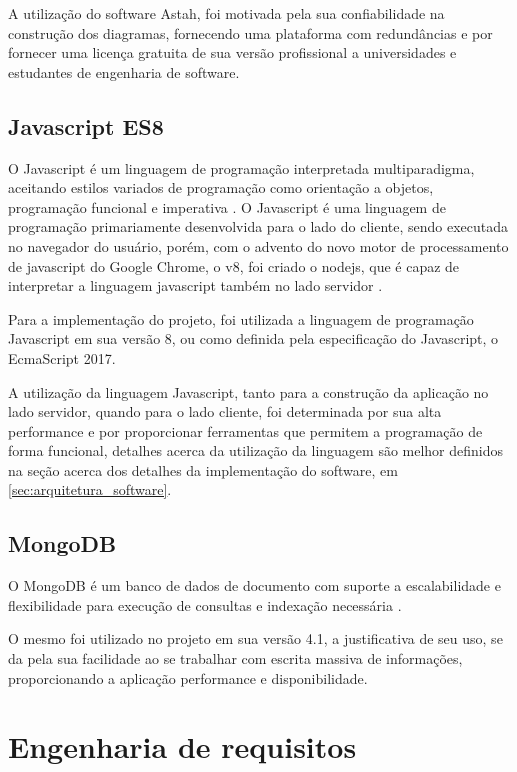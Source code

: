 A utilização do software Astah, foi motivada pela sua confiabilidade na construção dos diagramas, fornecendo uma plataforma com redundâncias e por fornecer uma licença gratuita de sua versão profissional a universidades e estudantes de engenharia de software.

\section{Javascript ES8}

O Javascript é um linguagem de programação interpretada multiparadigma, aceitando estilos variados de programação como orientação a objetos, programação funcional e imperativa \cite{mozilla_javascript}. O Javascript é uma linguagem de programação primariamente desenvolvida para o lado do cliente, sendo executada no navegador do usuário, porém, com o advento do novo motor de processamento de javascript do Google Chrome, o v8, foi criado o nodejs, que é capaz de interpretar a linguagem javascript também no lado servidor \cite{nodejs_about}.

Para a implementação do projeto, foi utilizada a linguagem de programação Javascript em sua versão 8, ou como definida pela especificação do Javascript, o EcmaScript 2017.

A utilização da linguagem Javascript, tanto para a construção da aplicação no lado servidor, quando para o lado cliente, foi determinada por sua alta performance e por proporcionar ferramentas que permitem a programação de forma funcional, detalhes acerca da utilização da linguagem são melhor definidos na seção acerca dos detalhes da implementação do software, em \ref{sec:arquitetura_software}.

\section{MongoDB}

O MongoDB é um banco de dados de documento com suporte a escalabilidade e flexibilidade para execução de consultas e indexação necessária \cite{what_mongodb}.

O mesmo foi utilizado no projeto em sua versão 4.1, a justificativa de seu uso, se da pela sua facilidade ao se trabalhar com escrita massiva de informações, proporcionando a aplicação performance e disponibilidade.

\chapter{Engenharia de requisitos}


